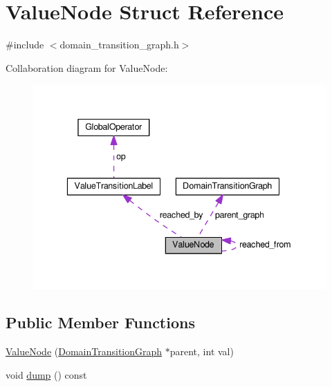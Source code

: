 \hypertarget{structValueNode}{\section{Value\-Node Struct Reference}
\label{structValueNode}
}


{\ttfamily \#include $<$domain\-\_\-transition\-\_\-graph.\-h$>$}



Collaboration diagram for Value\-Node\-:
\nopagebreak
\begin{figure}[H]
\begin{center}
\leavevmode
\includegraphics[width=338pt]{structValueNode__coll__graph}
\end{center}
\end{figure}
\subsection*{Public Member Functions}
\begin{DoxyCompactItemize}
\item 
\hyperlink{structValueNode_ab36d93146165dc6c2ba903808bd8a530}{Value\-Node} (\hyperlink{classDomainTransitionGraph}{Domain\-Transition\-Graph} $\ast$parent, int val)
\item 
void \hyperlink{structValueNode_acf7914bbe0f66b97e9d31a9c08908b22}{dump} () const 
\end{DoxyCompactItemize}

